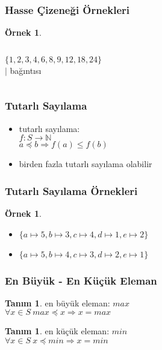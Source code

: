 \documentclass[dvipsnames]{beamer}
\theoremstyle{definition}
\newtheorem{tanim}[theorem]{Tanım}
\theoremstyle{example}
\newtheorem{ornek}[theorem]{Örnek}
\theoremstyle{plain}
\begin{document}
\begin{frame}
  \frametitle{Hasse Çizeneği Örnekleri}

  \begin{ornek}
    \begin{columns}
      $\{1,2,3,4,6,8,9,12,18,24\}$\\
      $|$ bağıntısı

      \begin{center}
      \end{center}
    \end{columns}
  \end{ornek}
\end{frame}

\begin{frame}
  \frametitle{Tutarlı Sayılama}

  \begin{itemize}
    \item tutarlı sayılama:\\
      $f: S \rightarrow \mathbb{N}$\\
      $a \preceq b \Rightarrow f(a) \leq f(b)$

    \medskip
    \item birden fazla tutarlı sayılama olabilir
  \end{itemize}
\end{frame}

\begin{frame}
  \frametitle{Tutarlı Sayılama Örnekleri}

  \begin{ornek}
    \begin{center}
    \end{center}

    \begin{itemize}
     \item $\{a \longmapsto 5, b \longmapsto 3, c \longmapsto 4,
      d \longmapsto 1, e \longmapsto 2\}$

     \pause
     \item $\{a \longmapsto 5, b \longmapsto 4, c \longmapsto 3,
      d \longmapsto 2, e \longmapsto 1\}$
    \end{itemize}
  \end{ornek}
\end{frame}

\begin{frame}
  \frametitle{En Büyük - En Küçük Eleman}

  \begin{tanim}
    \alert{en büyük eleman}: $max$\\
    $\forall x \in S~max \preceq x \Rightarrow x = max$
  \end{tanim}

  \pause
  \begin{tanim}
    \alert{en küçük eleman}: $min$\\
    $\forall x \in S~x \preceq min \Rightarrow x = min$
  \end{tanim}
\end{frame}
\end{document}
